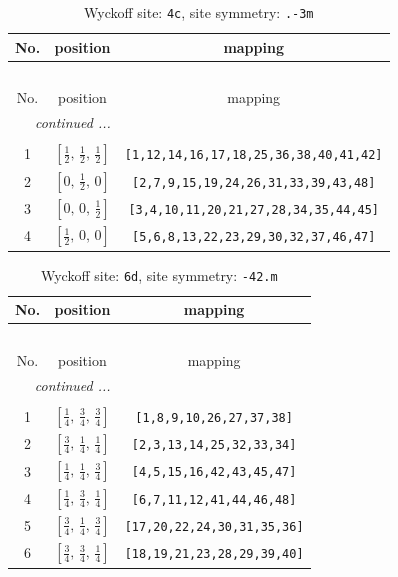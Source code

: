 \documentclass[fleqn,8pt]{jsarticle}
\begin{document}
\renewcommand{\arraystretch}{1.2}
\begin{longtable}{ccc}
\caption{Wyckoff site: {\tt 4c}, site symmetry: {\tt .-3m}}
 \\
 \hline \hline
No. & position & mapping \\ \hline \endfirsthead

\multicolumn{2}{l}{\tablename\ \thetable{}} \\
 \hline \hline
No. & position & mapping \\ \hline \endhead

 \hline \hline
\multicolumn{2}{r}{\footnotesize\it continued ...} \\ \endfoot

 \hline \hline
\multicolumn{2}{r}{} \\ \endlastfoot

1 & $\left[ \frac{1}{2},\, \frac{1}{2},\, \frac{1}{2} \right]$ & {\tt [1,12,14,16,17,18,25,36,38,40,41,42]} \\ \hline
2 & $\left[ 0,\, \frac{1}{2},\, 0 \right]$ & {\tt [2,7,9,15,19,24,26,31,33,39,43,48]} \\ \hline
3 & $\left[ 0,\, 0,\, \frac{1}{2} \right]$ & {\tt [3,4,10,11,20,21,27,28,34,35,44,45]} \\ \hline
4 & $\left[ \frac{1}{2},\, 0,\, 0 \right]$ & {\tt [5,6,8,13,22,23,29,30,32,37,46,47]} \\
\end{longtable}
\renewcommand{\arraystretch}{1.2}
\begin{longtable}{ccc}
\caption{Wyckoff site: {\tt 6d}, site symmetry: {\tt -42.m}}
 \\
 \hline \hline
No. & position & mapping \\ \hline \endfirsthead

\multicolumn{2}{l}{\tablename\ \thetable{}} \\
 \hline \hline
No. & position & mapping \\ \hline \endhead

 \hline \hline
\multicolumn{2}{r}{\footnotesize\it continued ...} \\ \endfoot

 \hline \hline
\multicolumn{2}{r}{} \\ \endlastfoot

1 & $\left[ \frac{1}{4},\, \frac{3}{4},\, \frac{3}{4} \right]$ & {\tt [1,8,9,10,26,27,37,38]} \\ \hline
2 & $\left[ \frac{3}{4},\, \frac{1}{4},\, \frac{1}{4} \right]$ & {\tt [2,3,13,14,25,32,33,34]} \\ \hline
3 & $\left[ \frac{1}{4},\, \frac{1}{4},\, \frac{3}{4} \right]$ & {\tt [4,5,15,16,42,43,45,47]} \\ \hline
4 & $\left[ \frac{1}{4},\, \frac{3}{4},\, \frac{1}{4} \right]$ & {\tt [6,7,11,12,41,44,46,48]} \\ \hline
5 & $\left[ \frac{3}{4},\, \frac{1}{4},\, \frac{3}{4} \right]$ & {\tt [17,20,22,24,30,31,35,36]} \\ \hline
6 & $\left[ \frac{3}{4},\, \frac{3}{4},\, \frac{1}{4} \right]$ & {\tt [18,19,21,23,28,29,39,40]} \\
\end{longtable}
\end{document}
